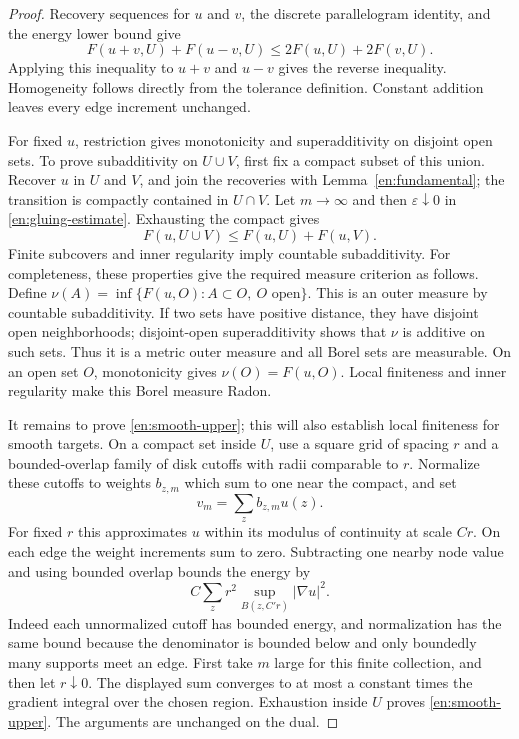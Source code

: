 \begin{proof}
Recovery sequences for $u$ and $v$, the discrete parallelogram identity,
and the energy lower bound give
\[
 F(u+v,U)+F(u-v,U)\le2F(u,U)+2F(v,U).
\]
Applying this inequality to $u+v$ and $u-v$ gives the reverse inequality.
Homogeneity follows directly from the tolerance definition.  Constant
addition leaves every edge increment unchanged.

For fixed $u$, restriction gives monotonicity and superadditivity on
disjoint open sets.  To prove subadditivity on $U\cup V$, first fix a
compact subset of this union.  Recover $u$ in $U$ and $V$, and join the
recoveries with Lemma~\ref{en:fundamental}; the transition is compactly
contained in $U\cap V$.  Let $m\to\infty$ and then
$\varepsilon\downarrow0$ in \eqref{en:gluing-estimate}.  Exhausting the
compact gives
\[
                   F(u,U\cup V)\le F(u,U)+F(u,V).
\]
Finite subcovers and inner regularity imply countable subadditivity.
For completeness, these properties give the required measure criterion
as follows.  Define
$\nu(A)=\inf\{F(u,O):A\subset O,\ O\text{ open}\}$.
This is an outer measure by countable subadditivity.  If two sets have
positive distance, they have disjoint open neighborhoods; disjoint-open
superadditivity shows that $\nu$ is additive on such sets.  Thus it is a
metric outer measure and all Borel sets are measurable.  On an open set
$O$, monotonicity gives $\nu(O)=F(u,O)$.  Local finiteness and inner
regularity make this Borel measure Radon.

It remains to prove \eqref{en:smooth-upper}; this will also establish
local finiteness for smooth targets.  On a compact set inside $U$, use a
square grid of spacing $r$ and a bounded-overlap family of disk cutoffs
with radii comparable to $r$.  Normalize these cutoffs to weights
$b_{z,m}$ which sum to one near the compact, and set
\[
                         v_m=\sum_z b_{z,m}u(z).
\]
For fixed $r$ this approximates $u$ within its modulus of continuity at
scale $Cr$.  On each edge the weight increments sum to zero.  Subtracting
one nearby node value and using bounded overlap bounds the energy by
\[
 C\sum_z r^2\sup_{B(z,C'r)}|\nabla u|^2.
\]
Indeed each unnormalized cutoff has bounded energy, and normalization
has the same bound because the denominator is bounded below and only
boundedly many supports meet an edge.  First take $m$ large for this
finite collection, and then let $r\downarrow0$.  The displayed sum
converges to at most a constant times the gradient integral over the
chosen region.  Exhaustion inside $U$ proves
\eqref{en:smooth-upper}.  The arguments are unchanged on the dual.
\end{proof}

